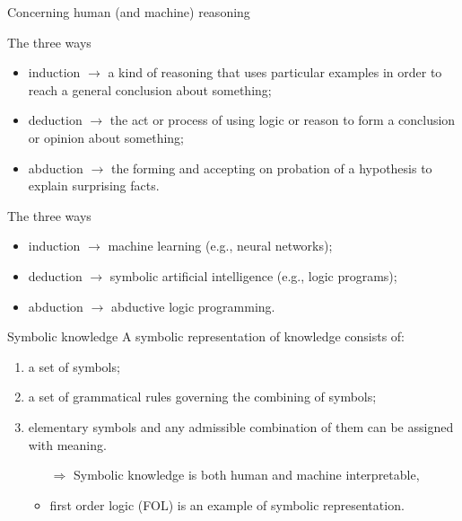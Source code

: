 \documentclass[presentation]{beamer}\mode<presentation>{\usetheme{AMSBolognaFC}}
\begin{document}
\begin{frame}[allowframebreaks]{Concerning human (and machine) reasoning}
    
    \begin{block}{The three ways}
        \begin{itemize}
            \item \alert{induction} $\rightarrow$ a kind of reasoning that uses particular examples in order to reach a general conclusion about something;
            \item \alert{deduction} $\rightarrow$ the act or process of using logic or reason to form a conclusion or opinion about something;
            \item \alert{abduction} $\rightarrow$ the forming and accepting on probation of a hypothesis to explain surprising facts.
        \end{itemize}
    \end{block}

    \framebreak
    
     \begin{block}{The three ways}
        \begin{itemize}
            \item \alert{induction} $\rightarrow$ machine learning (e.g., neural networks);
            \item \alert{deduction} $\rightarrow$ symbolic artificial intelligence (e.g., logic programs);
            \item \alert{abduction} $\rightarrow$ abductive logic programming.
        \end{itemize}
    \end{block}

    \framebreak

    \begin{block}{Symbolic knowledge}
        A symbolic representation of knowledge consists of: 
        \begin{enumerate}
            \item a set of symbols;
            \item\label{item:symbolic-combination} a set of grammatical rules governing the combining of symbols; 
            \item\label{item:symbolic-assignment} elementary symbols and any admissible combination of them can be assigned with meaning.
            \begin{itemize}
                \item[$\Rightarrow$] Symbolic knowledge is both human and machine interpretable,
                \item first order logic (FOL) is an example of symbolic representation.
            \end{itemize}
        \end{enumerate}
    \end{block}
    

\end{frame}
\end{document}
